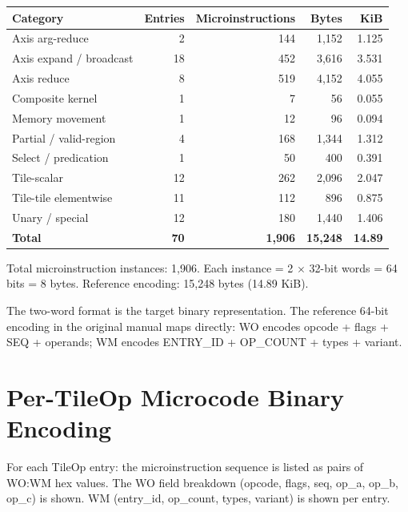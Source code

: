 \begin{center}
\begin{tabular}{lrrrr}
\toprule
Category & Entries & Microinstructions & Bytes & KiB \\
\midrule
Axis arg-reduce          &   2 &  144 &  1,152 & 1.125 \\
Axis expand / broadcast   &  18 &  452 &  3,616 & 3.531 \\
Axis reduce              &   8 &  519 &  4,152 & 4.055 \\
Composite kernel         &   1 &    7 &     56 & 0.055 \\
Memory movement          &   1 &   12 &     96 & 0.094 \\
Partial / valid-region   &   4 &  168 &  1,344 & 1.312 \\
Select / predication     &   1 &   50 &    400 & 0.391 \\
Tile-scalar              &  12 &  262 &  2,096 & 2.047 \\
Tile-tile elementwise    &  11 &  112 &    896 & 0.875 \\
Unary / special         &  12 &  180 &  1,440 & 1.406 \\
\midrule
\textbf{Total}          & \textbf{70} & \textbf{1,906} & \textbf{15,248} & \textbf{14.89} \\
\bottomrule
\end{tabular}
\end{center}

Total microinstruction instances: 1,906. Each instance = 2 $\times$ 32-bit words = 64 bits = 8 bytes. Reference encoding: 15,248 bytes (14.89 KiB).

The two-word format is the target binary representation. The reference 64-bit encoding in the original manual maps directly: WO encodes opcode + flags + SEQ + operands; WM encodes ENTRY\_ID + OP\_COUNT + types + variant.

\clearpage

\section{Per-TileOp Microcode Binary Encoding}

For each TileOp entry: the microinstruction sequence is listed as pairs of WO:WM hex values. The WO field breakdown (opcode, flags, seq, op\_a, op\_b, op\_c) is shown. WM (entry\_id, op\_count, types, variant) is shown per entry.

